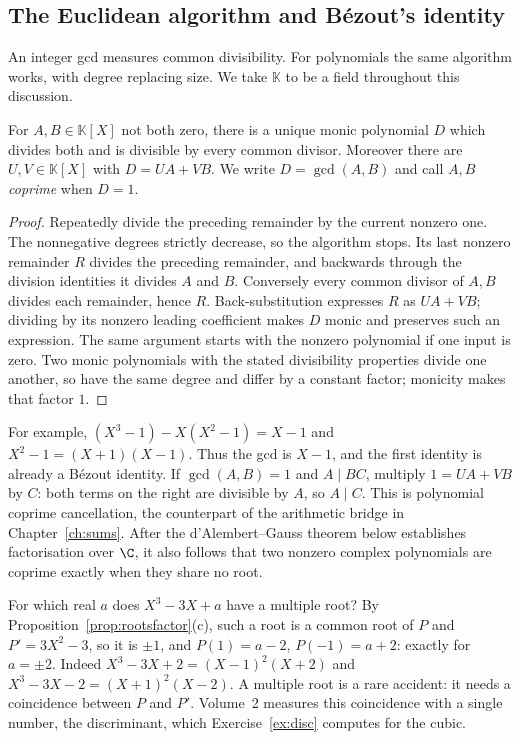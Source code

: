 \subsection*{The Euclidean algorithm and B\'ezout's identity}
An integer gcd measures common divisibility. For polynomials the same algorithm works, with degree replacing size. We take $\mathbb K$ to be a field throughout this discussion.

\begin{proposition}\label{prop:polynomial-bezout}
For $A,B\in\mathbb K[X]$ not both zero, there is a unique monic polynomial $D$ which divides both and is divisible by every common divisor. Moreover there are $U,V\in\mathbb K[X]$ with $D=UA+VB$. We write $D=\gcd(A,B)$ and call $A,B$ \emph{coprime} when $D=1$.
\end{proposition}
\begin{proof}
Repeatedly divide the preceding remainder by the current nonzero one. The nonnegative degrees strictly decrease, so the algorithm stops. Its last nonzero remainder $R$ divides the preceding remainder, and backwards through the division identities it divides $A$ and $B$. Conversely every common divisor of $A,B$ divides each remainder, hence $R$. Back-substitution expresses $R$ as $UA+VB$; dividing by its nonzero leading coefficient makes $D$ monic and preserves such an expression. The same argument starts with the nonzero polynomial if one input is zero. Two monic polynomials with the stated divisibility properties divide one another, so have the same degree and differ by a constant factor; monicity makes that factor $1$.
\end{proof}

For example, $(X^3-1)-X(X^2-1)=X-1$ and $X^2-1=(X+1)(X-1)$. Thus the gcd is $X-1$, and the first identity is already a B\'ezout identity. If $\gcd(A,B)=1$ and $A\mid BC$, multiply $1=UA+VB$ by $C$: both terms on the right are divisible by $A$, so $A\mid C$. This is polynomial coprime cancellation, the counterpart of the arithmetic bridge in Chapter~\ref{ch:sums}. After the d'Alembert--Gauss theorem below establishes factorisation over $\C$, it also follows that two nonzero complex polynomials are coprime exactly when they share no root.

\begin{examplex}
For which real $a$ does $X^3-3X+a$ have a multiple root? By Proposition~\ref{prop:rootsfactor}(c), such a root is a common root of $P$ and $P'=3X^2-3$, so it is $\pm1$, and
$P(1)=a-2$, $P(-1)=a+2$: exactly for $a=\pm2$. Indeed $X^3-3X+2=(X-1)^2(X+2)$ and $X^3-3X-2=(X+1)^2(X-2)$.
A multiple root is a rare accident: it needs a coincidence between $P$ and $P'$. Volume~2 measures this coincidence with a single number, the
discriminant, which Exercise~\ref{ex:disc} computes for the cubic.
\end{examplex}

